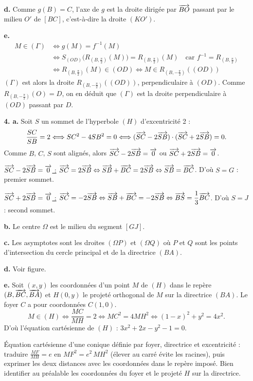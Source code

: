 \documentclass[11pt]{article}
\begin{document}
\textbf{d.} Comme $g(B) = C$, l'axe de $g$ est la droite dirigée par $\overrightarrow{BO}$ passant par le milieu $O'$ de $[BC]$, c'est-à-dire la droite $(KO')$.

\textbf{e.}
\begin{align*}
M \in (\Gamma) &\Longleftrightarrow g(M) = f^{-1}(M) \\
&\Longleftrightarrow S_{(OD)}\big(R_{(B,\frac{\pi}{2})}(M)\big) = R_{(B,\frac{\pi}{2})}(M) \quad \text{car } f^{-1} = R_{(B,\frac{\pi}{2})} \\
&\Longleftrightarrow R_{(B,\frac{\pi}{2})}(M) \in (OD) \Longleftrightarrow M \in R_{(B,-\frac{\pi}{2})}((OD))
\end{align*}
$(\Gamma)$ est alors la droite $R_{(B,-\frac{\pi}{2})}((OD))$, perpendiculaire à $(OD)$. Comme $R_{(B,-\frac{\pi}{2})}(O) = D$, on en déduit que $(\Gamma)$ est la droite perpendiculaire à $(OD)$ passant par $D$.

\textbf{4. a.} Soit $S$ un sommet de l'hyperbole $(H)$ d'excentricité 2 :
\[ \frac{SC}{SB} = 2 \Longleftrightarrow SC^2 - 4SB^2 = 0 \Longleftrightarrow (\overrightarrow{SC} - 2\overrightarrow{SB}) \cdot (\overrightarrow{SC} + 2\overrightarrow{SB}) = 0. \]
Comme $B$, $C$, $S$ sont alignés, alors $\overrightarrow{SC} - 2\overrightarrow{SB} = \overrightarrow{0}$ ou $\overrightarrow{SC} + 2\overrightarrow{SB} = \overrightarrow{0}$.

\underline{$\overrightarrow{SC} - 2\overrightarrow{SB} = \overrightarrow{0}$ :} $\overrightarrow{SC} = 2\overrightarrow{SB} \Leftrightarrow \overrightarrow{SB} + \overrightarrow{BC} = 2\overrightarrow{SB} \Leftrightarrow \overrightarrow{SB} = \overrightarrow{BC}$. D'où $S = G$ : premier sommet.

\underline{$\overrightarrow{SC} + 2\overrightarrow{SB} = \overrightarrow{0}$ :} $\overrightarrow{SC} = -2\overrightarrow{SB} \Leftrightarrow \overrightarrow{SB} + \overrightarrow{BC} = -2\overrightarrow{SB} \Leftrightarrow \overrightarrow{BS} = \dfrac{1}{3}\overrightarrow{BC}$. D'où $S = J$ : second sommet.

\textbf{b.} Le centre $\Omega$ est le milieu du segment $[GJ]$.

\textbf{c.} Les asymptotes sont les droites $(\Omega P)$ et $(\Omega Q)$ où $P$ et $Q$ sont les points d'intersection du cercle principal et de la directrice $(BA)$.

\textbf{d.} Voir figure.

\textbf{e.} Soit $(x, y)$ les coordonnées d'un point $M$ de $(H)$ dans le repère $(B,\overrightarrow{BC},\overrightarrow{BA})$ et $H(0, y)$ le projeté orthogonal de $M$ sur la directrice $(BA)$. Le foyer $C$ a pour coordonnées $C(1, 0)$.
\[ M \in (H) \Longleftrightarrow \frac{MC}{MH} = 2 \Longleftrightarrow MC^2 = 4MH^2 \Longleftrightarrow (1 - x)^2 + y^2 = 4x^2. \]
D'où l'équation cartésienne de $(H)$ : $3x^2 + 2x - y^2 - 1 = 0$.

\begin{methode}
Équation cartésienne d'une conique définie par foyer, directrice et
excentricité : traduire $\frac{MF}{MH} = e$ en $MF^2 = e^2\,MH^2$
(élever au carré évite les racines), puis exprimer les deux distances
avec les coordonnées dans le repère imposé. Bien identifier au préalable
les coordonnées du foyer et le projeté $H$ sur la directrice.
\end{methode}
\end{document}

